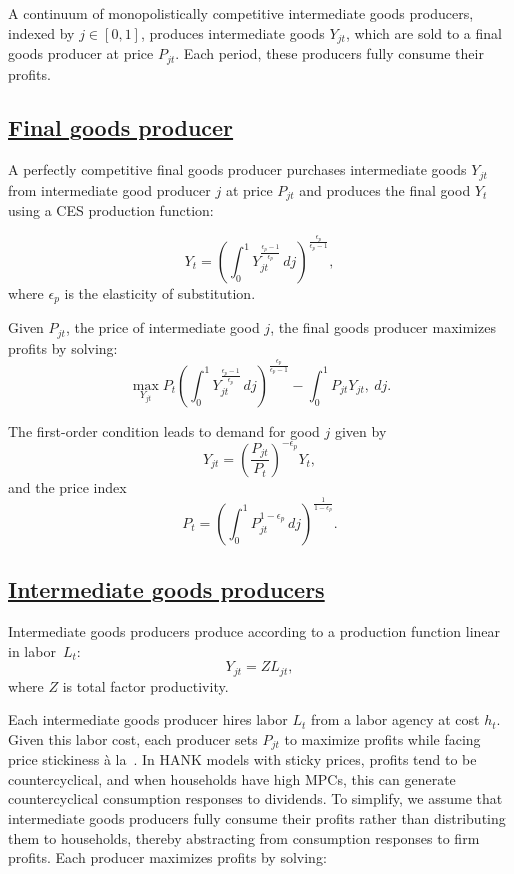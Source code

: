 \documentclass[\latexroot/\projectname]{subfiles}
\begin{document}
A continuum of monopolistically competitive intermediate goods producers, indexed by \( j \in [0,1] \), produces intermediate goods \( Y_{jt} \), which are sold to a final goods producer at price \( P_{jt} \). Each period, these producers fully consume their profits.

\subsection{\href{\WebBase\#sec:hank-final-goods-producer}{Final goods producer}}\whenintegrated{\label{sec:hank-final-goods-producer}}

A perfectly competitive final goods producer purchases intermediate goods \( Y_{jt} \) from intermediate good producer $j$ at price \( P_{jt} \) and produces the final good \( Y_t \) using a CES production function:

\[
  Y_{t} = {\left(\int_{0}^{1} Y_{jt}^{\frac{\epsilon_{p}-1}{\epsilon_{p}}}\, dj\right)}^{\frac{\epsilon_{p}}{\epsilon_{p}-1}},
\]
where $\epsilon_{p}$ is the elasticity of substitution.

Given $P_{jt}$, the price of intermediate good $j$, the final goods producer maximizes profits by solving:
\[
  \max_{Y_{jt}} P_{t} {\left(\int_{0}^{1} Y_{jt}^{\frac{\epsilon_{p}-1}{\epsilon_{p}}}\, dj\right)}^{\frac{\epsilon_{p}}{\epsilon_{p}-1}} - \int_{0}^{1} P_{jt} Y_{jt} ,\ dj.
\]

The first-order condition leads to demand for good $j$ given by
\[
  Y_{jt} = {\left(\frac {P_{jt}}{P_{t}}\right)}^{- \epsilon_{p}} Y_{t},
\]
and the price index
\[
  P_{t} = {\left(\int_{0}^{1} P_{jt}^{1-\epsilon_{p}}\,dj \right )}^{\frac{1}{1-\epsilon_{p}}}.
\]

\subsection{\href{\WebBase\#sec:hank-intermediate-goods-producers}{Intermediate goods producers}}\whenintegrated{\label{sec:hank-intermediate-goods-producers}}

Intermediate goods producers produce according to a production function linear in labor~$L_{t}$:
\[
  Y_{jt} =  Z L_{jt},
\]
where $Z$ is total factor productivity.

Each intermediate goods producer hires labor \( L_t \) from a labor agency at cost \( h_t \). Given this labor cost, each producer sets \( P_{jt} \) to maximize profits while facing price stickiness à la~\cite{Rotemberg1982}. In HANK models with sticky prices, profits tend to be countercyclical, and when households have high MPCs, this can generate countercyclical consumption responses to dividends. To simplify, we assume that intermediate goods producers fully consume their profits rather than distributing them to households, thereby abstracting from consumption responses to firm profits. Each producer maximizes profits by solving:
\end{document}
